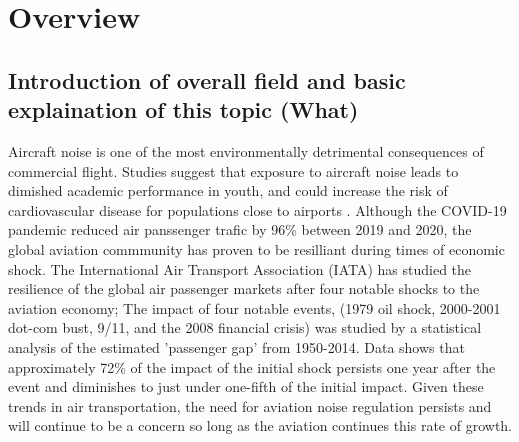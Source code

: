 \section{Overview}
\subsection{Introduction of overall field and basic explaination of this topic (What)}
Aircraft noise is one of the most environmentally detrimental consequences of
commercial flight. Studies suggest that exposure to aircraft noise leads
to dimished academic performance in youth, and could increase the risk of 
cardiovascular disease for populations close to airports \cite{Basner2017}. 
Although the COVID-19 pandemic reduced air panssenger trafic by 96\% between 2019 
and 2020, \cite{pandemicReport} the global aviation commmunity has proven 
to be resilliant during times of economic shock. The International Air Transport
Association (IATA) has studied the resilience of the global air passenger markets after four notable shocks to the aviation economy; 
The impact of four notable events, (1979 oil shock, 2000-2001 dot-com bust, 9/11, and the 2008 financial crisis) 
was studied by a statistical analysis of the estimated 'passenger gap' from 1950-2014. 
Data shows that approximately 72\% of the impact of the initial shock persists 
one year after the event and diminishes to just under one-fifth of the initial impact. 
Given these trends in air transportation, the need for  aviation noise  
regulation persists and will continue to be a concern so long as the aviation
continues this rate of growth.

